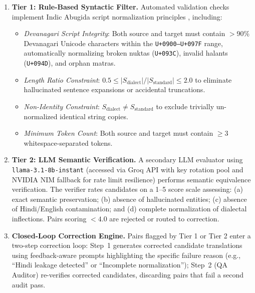 \begin{enumerate}
    \item \textbf{Tier 1: Rule-Based Syntactic Filter.} Automated validation checks implement Indic Abugida script normalization principles \cite{ansary2024unicode}, including:
    \begin{itemize}
        \item \emph{Devanagari Script Integrity}: Both source and target must contain $>$90\% Devanagari Unicode characters within the \texttt{U+0900--U+097F} range, automatically normalizing broken nuktas (\texttt{U+093C}), invalid halants (\texttt{U+094D}), and orphan matras.
        \item \emph{Length Ratio Constraint}: $0.5 \le |S_{\text{dialect}}| / |S_{\text{standard}}| \le 2.0$ to eliminate hallucinated sentence expansions or accidental truncations.
        \item \emph{Non-Identity Constraint}: $S_{\text{dialect}} \neq S_{\text{standard}}$ to exclude trivially un-normalized identical string copies.
        \item \emph{Minimum Token Count}: Both source and target must contain $\ge 3$ whitespace-separated tokens.
    \end{itemize}
    \item \textbf{Tier 2: LLM Semantic Verification.} A secondary LLM evaluator using \texttt{llama-3.1-8b-instant} (accessed via Groq API with key rotation pool and NVIDIA NIM fallback for rate limit resilience) performs semantic equivalence verification. The verifier rates candidates on a 1--5 score scale assessing: (a) exact semantic preservation; (b) absence of hallucinated entities; (c) absence of Hindi/English contamination; and (d) complete normalization of dialectal inflections. Pairs scoring $< 4.0$ are rejected or routed to correction.
    \item \textbf{Closed-Loop Correction Engine.} Pairs flagged by Tier 1 or Tier 2 enter a two-step correction loop: Step~1 generates corrected candidate translations using feedback-aware prompts highlighting the specific failure reason (e.g., ``Hindi leakage detected'' or ``Incomplete normalization''); Step~2 (QA Auditor) re-verifies corrected candidates, discarding pairs that fail a second audit pass.
\end{enumerate}

